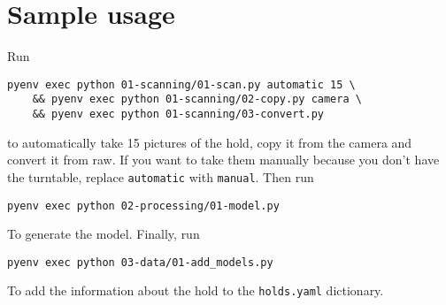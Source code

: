 \section{Sample usage}

Run

\begin{verbatim}
pyenv exec python 01-scanning/01-scan.py automatic 15 \
	&& pyenv exec python 01-scanning/02-copy.py camera \
	&& pyenv exec python 01-scanning/03-convert.py
\end{verbatim}

to automatically take 15 pictures of the hold, copy it from the camera
and convert it from raw. If you want to take them manually because you
don't have the turntable, replace \texttt{automatic} with
\texttt{manual}. Then run

\begin{verbatim}
pyenv exec python 02-processing/01-model.py
\end{verbatim}

To generate the model. Finally, run

\begin{verbatim}
pyenv exec python 03-data/01-add_models.py
\end{verbatim}

To add the information about the hold to the \texttt{holds.yaml}
dictionary.
